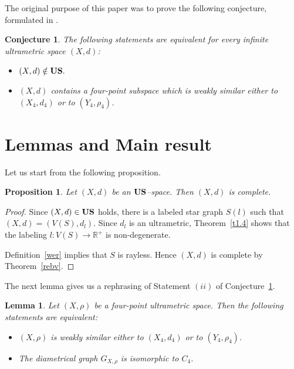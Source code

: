 \documentclass[11pt]{article}
\newtheorem{lemma}[theorem]{Lemma}
\newtheorem{proposition}[theorem]{Proposition}
\newtheorem{conjecture}[theorem]{Conjecture}
\theoremstyle{definition}
\theoremstyle{remark}
\numberwithin{equation}{section}
\begin{document}
The original purpose of this paper was to prove the following conjecture, formulated in \cite{DCR2025OJAC}.



\begin{conjecture}%
\label{sepjtg}
The following statements are equivalent for every infinite ultrametric space $(X,d)$:
\begin{itemize}[left=10pt]
\item[(i)]  $(X, d) \notin {\bf US}.$

\item[(ii)] $(X, d)$ contains a four-point subspace which is weakly similar either to $(X_4,d_4)$ or to $(Y_4,\rho_4)$.
\end{itemize}
\end{conjecture}









\section{Lemmas and Main result}



\hspace{5 mm}





Let us start from the following proposition.


\begin{proposition}\label{piuu}
Let $(X,d)$ be an $\bf US$--space. Then $(X,d)$ is complete.
\end{proposition}

\begin{proof}
Since $(X,d)\in {\bf US}$ holds, there is a labeled star graph $S(l)$ such that
$
(X,d) = (V(S), d_l).
$
Since $d_l$ is an ultrametric, Theorem~\ref{t1.4} shows that the labeling 
$
l \colon V(S)\to \mathbb{R}^+
$
is non-degenerate.  

Definition~\ref{wer} implies that $S$ is rayless. Hence $(X,d)$ is complete by Theorem~\ref{rebv}.
\end{proof}



The next lemma gives us a rephrasing of Statement $(ii)$ of Conjecture~\ref{sepjtg}.





\begin{lemma}\label{pidscy}
Let $(X,\rho)$ be a four-point ultrametric space. Then the following statements are equivalent:
\begin{itemize}[left=10pt]
    \item[(i)] $(X,\rho)$ is weakly similar either to $(X_4, d_4)$ or to $(Y_4, \rho_4)$.
    
    \item[(ii)] The diametrical graph $G_{X,\rho}$ is isomorphic to $C_4$.
\end{itemize}

\end{lemma}
\end{document}
